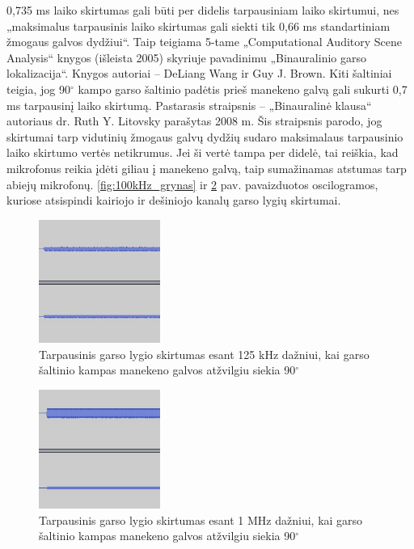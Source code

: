 \documentclass[]{vgtuef}
\begin{document}
0,735 ms laiko skirtumas gali būti per didelis tarpausiniam laiko skirtumui, nes „maksimalus tarpausinis laiko skirtumas gali siekti tik 0,66 ms standartiniam žmogaus galvos dydžiui“. Taip teigiama 5-tame „Computational Auditory Scene Analysis“ knygos (išleista 2005) skyriuje pavadinimu „Binauralinio garso lokalizacija“. Knygos autoriai – DeLiang Wang ir Guy J. Brown. Kiti šaltiniai teigia, jog 90$^\circ$ kampo garso šaltinio padėtis prieš manekeno galvą gali sukurti 0,7 ms tarpausinį laiko skirtumą. Pastarasis straipsnis – „Binauralinė klausa“ autoriaus dr. Ruth Y. Litovsky parašytas 2008 m. Šis straipsnis parodo, jog skirtumai tarp vidutinių žmogaus galvų dydžių sudaro maksimalaus tarpausinio laiko skirtumo vertės netikrumus. Jei ši vertė tampa per didelė, tai reiškia, kad mikrofonus reikia įdėti giliau į manekeno galvą, taip sumažinamas atstumas tarp abiejų mikrofonų. \ref{fig:100kHz_grynas} ir \ref{fig:1000kHz_TGLS} pav. pavaizduotos oscilogramos, kuriose atsispindi kairiojo ir dešiniojo kanalų garso lygių skirtumai.

\begin{figure}[!h]
  \centering
  \includegraphics[width=150px]{img/125kHz_TGLS.png}
  \caption{Tarpausinis garso lygio skirtumas esant 125 kHz dažniui, kai garso šaltinio kampas manekeno galvos atžvilgiu siekia 90$^\circ$}
  \label{fig:125kHz_TGLS}
\end{figure}

\begin{figure}[!h]
  \centering
  \includegraphics[width=150px]{img/1000kHz_TGLS.png}
  \caption{Tarpausinis garso lygio skirtumas esant 1 MHz dažniui, kai garso šaltinio kampas manekeno galvos atžvilgiu siekia 90$^\circ$}
  \label{fig:1000kHz_TGLS}
\end{figure}
\end{document}
